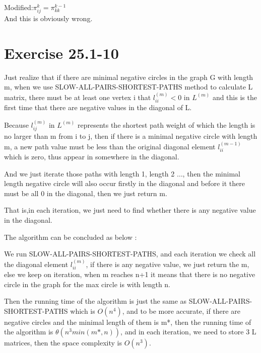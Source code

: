 \documentclass[oneside]{homework} %
\begin{document}
Modified:$\pi_{ij}^{k} = \pi_{kk}^{k-1}$
\\And this is obviously wrong.

\section{Exercise 25.1-10}
Just realize that if there are minimal negative circles in the graph G with length m, when we use SLOW-ALL-PAIRS-SHORTEST-PATHS method to calculate L matrix, there must be at least one vertex i that $l_{ii}^{(m)} < 0 $ in $L^{(m)}$ and this is the first time that there are negative values in the diagonal of L.

Because $l_{ij}^{(m)}$ in $L^{(m)}$ represents the shortest path weight of which the length is no larger than m from i to j, then if there is a minimal negative circle with length m, a new path value must be less than the original diagonal element $l_{ii}^{(m-1)}$ which is zero, thus appear in somewhere in the diagonal. 

And we just iterate those paths with length 1, length 2 $\ldots$, then the minimal length negative circle will also occur firstly in the diagonal and before it there must be all 0 in the diagonal, then we just return m. 

That is,in each iteration, we just need to find whether there is any negative value in the diagonal.

The algorithm can be concluded as below :

We run SLOW-ALL-PAIRS-SHORTEST-PATHS, and each iteration we check all the diagonal element $l_{ii}^{(m)}$, if there is any negative value, we just return the m, else we keep on iteration, when m reaches n+1 it means that there is no negative circle in the graph for the max circle is with length n.

Then the running time of the algorithm is just the same as SLOW-ALL-PAIRS-SHORTEST-PATHS which is $O(n^{4})$, and to be more accurate, if there are negative circles and the minimal length of them is m*, then the running time of the algorithm is $\theta(n^{3}min(m*,n))$, and in each iteration, we need to store 3 L matrices, then the space complexity is $O(n^{3})$.
\end{document}
